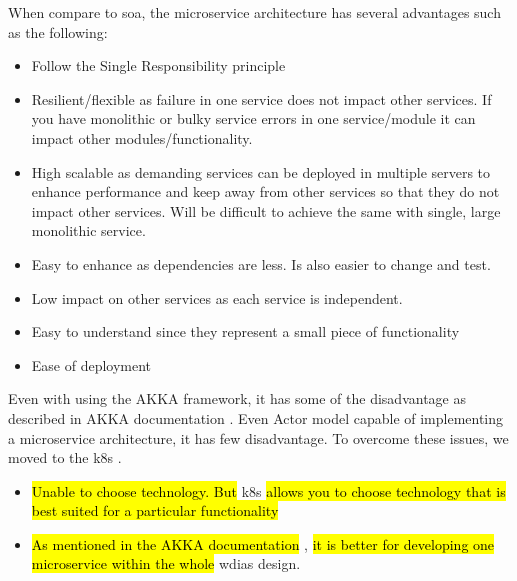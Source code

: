 When compare to \acrshort{soa}, the microservice architecture has several advantages such as the following:
\begin{itemize}
    \item Follow the Single Responsibility principle
    \item Resilient/flexible as failure in one service does not impact other services. If you have monolithic or bulky service errors in one service/module it can impact other modules/functionality.
    \item High scalable as demanding services can be deployed in multiple servers to enhance performance and keep away from other services so that they do not impact other services. Will be difficult to achieve the same with single, large monolithic service.
    \item Easy to enhance as dependencies are less. Is also easier to change and test.
    \item Low impact on other services as each service is independent. %
    \item Easy to understand since they represent a small piece of functionality
    \item Ease of deployment
\end{itemize}

Even with using the AKKA framework, it has some of the disadvantage as described in AKKA documentation \cite{Akka.ioWhenCluster}. Even Actor model capable of implementing a microservice architecture, it has few disadvantage. To overcome these issues, we moved to the \acrfull{k8s} \cite{LinuxFoundationProduction-GradeKubernetes}.

\begin{itemize}
    \item \hl{Unable to choose technology. But} \acrshort{k8s} \hl{allows you to choose technology that is best suited for a particular functionality}
    \item \hl{As mentioned in the AKKA documentation} \cite{Akka.ioWhenCluster}, \hl{it is better for developing one microservice within the whole} \acrshort{wdias} design.
\end{itemize}

